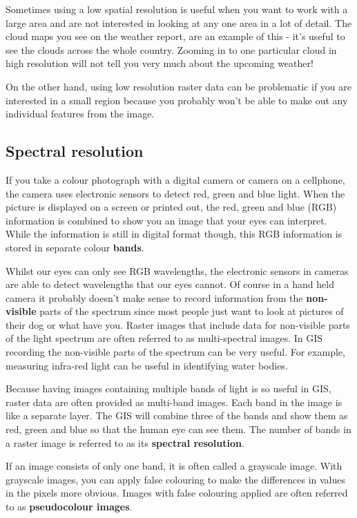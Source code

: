 Sometimes using a low spatial resolution is useful when you want to work with
a large area and are not interested in looking at any one area in a lot of
detail. The cloud maps you see on the weather report, are an example of this
- it's useful to see the clouds across the whole country. Zooming in to one
particular cloud in high resolution will not tell you very much about the
upcoming weather!

On the other hand, using low resolution raster data can be problematic if you
are interested in a small region because you probably won't be able to make
out any individual features from the image.

\subsection{Spectral resolution}

If you take a colour photograph with a digital camera or camera on a
cellphone, the camera uses electronic sensors to detect red, green and blue
light. When the picture is displayed on a screen or printed out, the red,
green and blue (RGB) information is combined to show you an image that your
eyes can interpret. While the information is still in digital format though,
this RGB information is stored in separate colour \textbf{bands}. 

Whilst our eyes can only see RGB wavelengths, the electronic sensors in
cameras are able to detect wavelengths that our eyes cannot. Of course in a
hand held camera it probably doesn't make sense to record information from
the \textbf{non-visible} parts of the spectrum since most people just want to
look at
pictures of their dog or what have you. Raster images that include data for
non-visible parts of the light spectrum are often referred to as
multi-spectral images. In GIS recording the non-visible parts of the spectrum
can be very useful. For example, measuring infra-red light can be useful in
identifying water bodies. 

Because having images containing multiple bands of light is so useful in GIS,
raster data are often provided as multi-band images. Each band in the image
is like a separate layer. The GIS will combine three of the bands and show
them as red, green and blue so that the human eye can see them. The number of
bands in a raster image is referred to as its \textbf{spectral resolution}.

If an image consists of only one band, it is often called a grayscale image.
With grayscale images, you can apply false colouring to make the differences
in values in the pixels more obvious. Images with false colouring applied are
often referred to as \textbf{pseudocolour images}.


